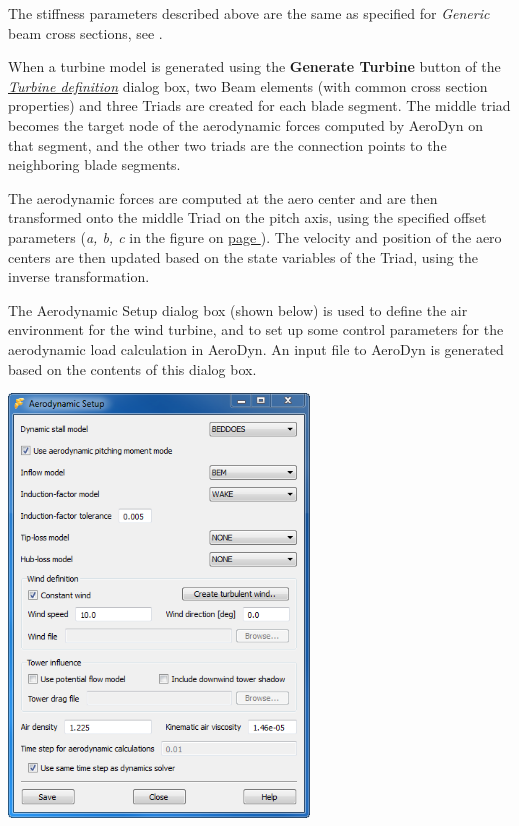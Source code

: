 The stiffness parameters described above are the same as specified for
{\sl Generic} beam cross sections,
see .

When a turbine model is generated using the \textbf{Generate Turbine}
button of the \protect\hyperlink{turbine-definition}{\sl Turbine definition}
dialog box, two Beam elements (with common cross section properties) and three
Triads are created for each blade segment. The middle triad becomes the target
node of the aerodynamic forces computed by AeroDyn on that segment, and the
other two triads are the connection points to the neighboring blade segments.

The aerodynamic forces are computed at the aero center and are then transformed
onto the middle Triad on the pitch axis, using the specified offset parameters
({\sl a, b, c} in the figure on \hyperref[blade-profile]{page }).
The velocity and position of the aero centers are then updated based on the
state variables of the Triad, using the inverse transformation.

\clearpage



The Aerodynamic Setup dialog box (shown below) is used to define the air
environment for the wind turbine, and to set up some control parameters for the
aerodynamic load calculation in AeroDyn. An input file to AeroDyn is generated
based on the contents of this dialog box.

\begin{center}
  \includegraphics[width=0.6\textwidth]{Figures/3b-AerodynamicSetup}
\end{center}

